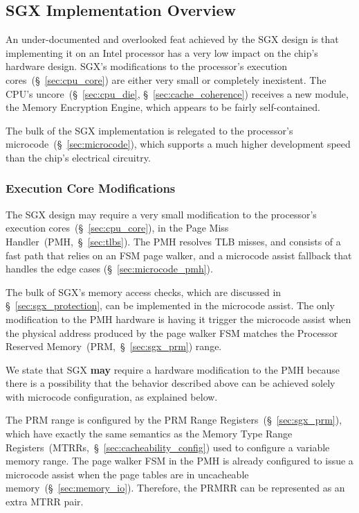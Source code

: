 \subsection{SGX Implementation Overview}

An under-documented and overlooked feat achieved by the SGX design is that
implementing it on an Intel processor has a very low impact on the chip's
hardware design. SGX's modifications to the processor's execution
cores~(\S~\ref{sec:cpu_core}) are either very small or completely inexistent.
The CPU's uncore~(\S~\ref{sec:cpu_die}, \S~\ref{sec:cache_coherence}) receives
a new module, the  Memory Encryption Engine, which appears to be fairly
self-contained.

The bulk of the SGX implementation is relegated to the processor's
microcode~(\S~\ref{sec:microcode}), which supports a much higher development
speed than the chip's electrical circuitry.


\subsubsection{Execution Core Modifications}

The SGX design may require a very small modification to the processor's
execution cores~(\S~\ref{sec:cpu_core}), in the Page Miss
Handler~(PMH,~\S~\ref{sec:tlbs}). The PMH resolves TLB misses, and consists of
a fast path that relies on an FSM page walker, and a microcode assist fallback
that handles the edge cases (\S~\ref{sec:microcode_pmh}).

The bulk of SGX's memory access checks, which are discussed in
\S~\ref{sec:sgx_protection}, can be implemented in the microcode assist. The
only modification to the PMH hardware is having it trigger the microcode assist
when the physical address produced by the page walker FSM matches the Processor
Reserved Memory~(PRM,~\S~\ref{sec:sgx_prm}) range.

We state that SGX \textbf{may} require a hardware modification to the PMH
because there is a possibility that the behavior described above can be
achieved solely with microcode configuration, as explained below.

The PRM range is configured by the PRM Range Registers~(\S~\ref{sec:sgx_prm}),
which have exactly the same semantics as the Memory Type Range
Registers~(MTRRs,~\S~\ref{sec:cacheability_config}) used to configure a
variable memory range. The page walker FSM in the PMH is already configured to
issue a microcode assist when the page tables are in uncacheable
memory~(\S~\ref{sec:memory_io}). Therefore, the PRMRR can be represented as an
extra MTRR pair.



